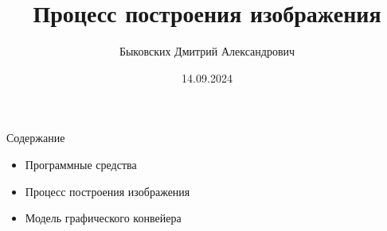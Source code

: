 \documentclass{beamer}
\title[Построение изображений]{Процесс построения изображения}
\author[Быковских Д.А.]{Быковских Дмитрий Александрович}
\date{14.09.2024}
\begin{document}
\begin{frame}
	\titlepage
\end{frame}

\begin{frame}{Содержание}
	\begin{itemize}
		\item
		      Программные средства
		\item
		      Процесс построения изображения
		\item
		      Модель графического конвейера
	\end{itemize}
\end{frame}
\end{document}
